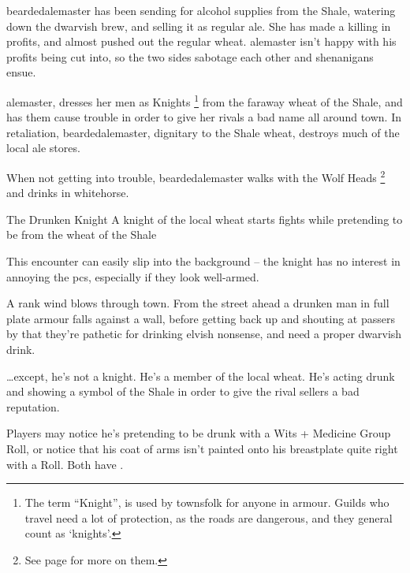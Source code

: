 
\label{troubleAle}

\noindent
\Gls{beardedalemaster} has been sending for alcohol supplies from the Shale, watering down the dwarvish brew, and selling it as regular ale.
She has made a killing in profits, and almost pushed out the regular \gls{wheat}.
\Gls{alemaster} isn't happy with his profits being cut into, so the two sides sabotage each other and shenanigans ensue.

\Gls{alemaster}, dresses her men as Knights%
\footnote{The term ``Knight'', is used by townsfolk for anyone in armour.
Guilds who travel need a lot of protection, as the roads are dangerous, and they general count as `knights'.}
from the faraway \gls{wheat} of the Shale, and has them cause trouble in order to give her rivals a bad name all around \gls{town}.
In retaliation, \gls{beardedalemaster}, dignitary to the Shale \gls{wheat}, destroys much of the local ale stores.

When not getting into trouble, \Gls{beardedalemaster} walks with the Wolf Heads%
\footnote{See page \pageref{beardedalemaster} for more on them.}
and drinks in \gls{whitehorse}.

{The Drunken Knight}%
{A knight of the local \gls{wheat} starts fights while pretending to be from the \gls{wheat} of the Shale}%

This encounter can easily slip into the background -- the knight has no interest in annoying the \glspl{pc}, especially if they look well-armed.

\begin{boxtext}

  A rank wind blows through \gls{town}.
  From the street ahead a drunken man in full plate armour falls against a wall, before getting back up and shouting at passers by that they're pathetic for drinking elvish nonsense, and need a proper dwarvish drink.

\end{boxtext}

\ldots except, he's not a knight.
He's a member of the local \gls{wheat}.
He's acting drunk and showing a symbol of the Shale in order to give the rival sellers a bad reputation.

Players may notice he's pretending to be drunk with a Wits + Medicine Group Roll, or notice that his coat of arms isn't painted onto his breastplate quite right with a  Roll.
Both have \tn[10].

